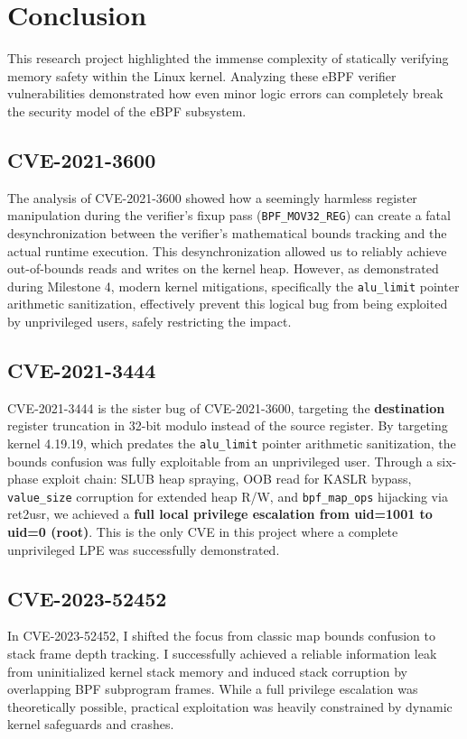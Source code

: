 \chapter{Conclusion}

This research project highlighted the immense complexity of statically verifying memory safety within the Linux kernel. Analyzing these eBPF verifier vulnerabilities demonstrated how even minor logic errors can completely break the security model of the eBPF subsystem.

\section{CVE-2021-3600}
The analysis of CVE-2021-3600 showed how a seemingly harmless register manipulation during the verifier's fixup pass (\texttt{BPF\_MOV32\_REG}) can create a fatal desynchronization between the verifier's mathematical bounds tracking and the actual runtime execution. This desynchronization allowed us to reliably achieve out-of-bounds reads and writes on the kernel heap. However, as demonstrated during Milestone 4, modern kernel mitigations, specifically the \texttt{alu\_limit} pointer arithmetic sanitization, effectively prevent this logical bug from being exploited by unprivileged users, safely restricting the impact.

\section{CVE-2021-3444}
CVE-2021-3444 is the sister bug of CVE-2021-3600, targeting the \textbf{destination} register truncation in 32-bit modulo instead of the source register. By targeting kernel 4.19.19, which predates the \texttt{alu\_limit} pointer arithmetic sanitization, the bounds confusion was fully exploitable from an unprivileged user. Through a six-phase exploit chain: SLUB heap spraying, OOB read for KASLR bypass, \texttt{value\_size} corruption for extended heap R/W, and \texttt{bpf\_map\_ops} hijacking via ret2usr, we achieved a \textbf{full local privilege escalation from uid=1001 to uid=0 (root)}. This is the only CVE in this project where a complete unprivileged LPE was successfully demonstrated.

\section{CVE-2023-52452}
In CVE-2023-52452, I shifted the focus from classic map bounds confusion to stack frame depth tracking. I successfully achieved a reliable information leak from uninitialized kernel stack memory and induced stack corruption by overlapping BPF subprogram frames. While a full privilege escalation was theoretically possible, practical exploitation was heavily constrained by dynamic kernel safeguards and crashes.

